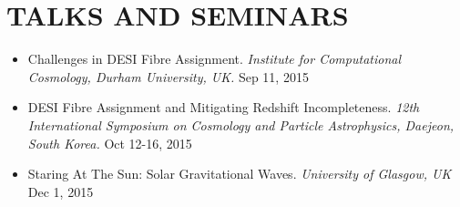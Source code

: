 \section{\textbf{\color{RoyalBlue}TALKS AND SEMINARS}}
\begin{itemize}

\item Challenges in DESI Fibre Assignment. {\sl Institute for Computational Cosmology, Durham University, UK.} \hfill Sep 11, 2015
\item DESI Fibre Assignment and Mitigating Redshift Incompleteness. {\sl 12th International Symposium on Cosmology and Particle Astrophysics, Daejeon, South Korea.} \hfill \hfill Oct 12-16, 2015
\item Staring At The Sun: Solar Gravitational Waves. {\sl University of Glasgow, UK} \hfill Dec 1, 2015
\end{itemize}